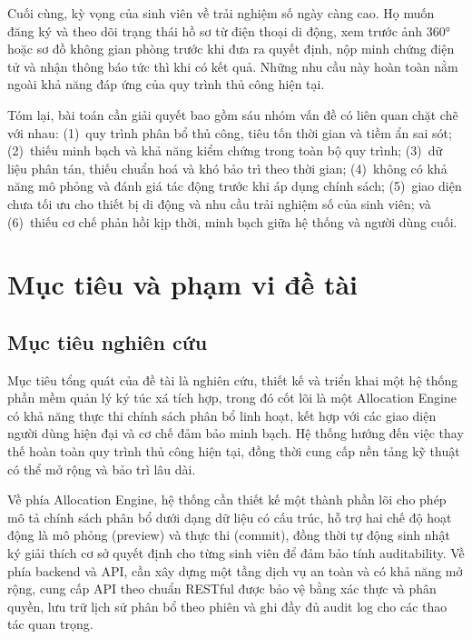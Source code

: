 ﻿\documentclass[a4paper,12pt,openany,oneside]{report}
\begin{document}
Cuối cùng, kỳ vọng của sinh viên về trải nghiệm số ngày càng cao. Họ muốn đăng
ký và theo dõi trạng thái hồ sơ từ điện thoại di động, xem trước ảnh 360° hoặc
sơ đồ không gian phòng trước khi đưa ra quyết định, nộp minh chứng điện tử và
nhận thông báo tức thì khi có kết quả. Những nhu cầu này hoàn toàn nằm ngoài
khả năng đáp ứng của quy trình thủ công hiện tại.

Tóm lại, bài toán cần giải quyết bao gồm sáu nhóm vấn đề có liên quan chặt chẽ
với nhau: (1)~quy trình phân bổ thủ công, tiêu tốn thời gian và tiềm ẩn sai sót;
(2)~thiếu minh bạch và khả năng kiểm chứng trong toàn bộ quy trình; (3)~dữ liệu
phân tán, thiếu chuẩn hoá và khó bảo trì theo thời gian; (4)~không có khả năng
mô phỏng và đánh giá tác động trước khi áp dụng chính sách; (5)~giao diện chưa
tối ưu cho thiết bị di động và nhu cầu trải nghiệm số của sinh viên; và
(6)~thiếu cơ chế phản hồi kịp thời, minh bạch giữa hệ thống và người dùng cuối.

\section{Mục tiêu và phạm vi đề tài}

\subsection{Mục tiêu nghiên cứu}

Mục tiêu tổng quát của đề tài là nghiên cứu, thiết kế và triển khai một hệ
thống phần mềm quản lý ký túc xá tích hợp, trong đó cốt lõi là một Allocation
Engine có khả năng thực thi chính sách phân bổ linh hoạt, kết hợp với các giao
diện người dùng hiện đại và cơ chế đảm bảo minh bạch. Hệ thống hướng đến việc
thay thế hoàn toàn quy trình thủ công hiện tại, đồng thời cung cấp nền tảng kỹ
thuật có thể mở rộng và bảo trì lâu dài.

Về phía Allocation Engine, hệ thống cần thiết kế một thành phần lõi cho phép
mô tả chính sách phân bổ dưới dạng dữ liệu có cấu trúc, hỗ trợ hai chế độ
hoạt động là mô phỏng (preview) và thực thi (commit), đồng thời tự động sinh
nhật ký giải thích cơ sở quyết định cho từng sinh viên để đảm bảo tính
auditability. Về phía backend và API, cần xây dựng một tầng dịch vụ an toàn và
có khả năng mở rộng, cung cấp API theo chuẩn RESTful được bảo vệ bằng xác thực
và phân quyền, lưu trữ lịch sử phân bổ theo phiên và ghi đầy đủ audit log cho
các thao tác quan trọng.
\end{document}

